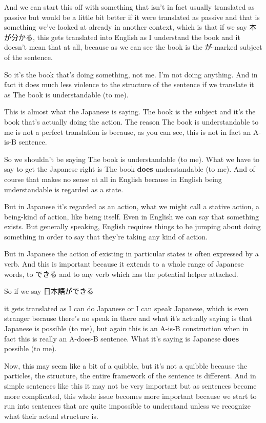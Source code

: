 And we can start this off with something that isn't in fact usually translated as passive but would be a little bit better if it were translated as passive and that is something we've looked at already in another context, which is that if we say 本が分かる, this gets translated into English as I understand the book and it doesn't mean that at all, because as we can see the book is the が-marked subject of the sentence.

{}

So it's the book that's doing something, not me. I'm not doing anything. And in fact it does much less violence to the structure of the sentence if we translate it as The book is understandable (to me).

This is almost what the Japanese is saying. The book is the subject and it's the book that's actually doing the action. The reason The book is understandable to me is not a perfect translation is because, as you can see, this is not in fact an A-is-B sentence.

So we shouldn't be saying The book is understandable (to me). What we have to say to get the Japanese right is The book {\bf does} understandable (to me). And of course that makes no sense at all in English because in English being understandable is regarded as a state.

But in Japanese it's regarded as an action, what we might call a stative action, a being-kind of action, like being itself. Even in English we can say that something exists. But generally speaking, English requires things to be jumping about doing something in order to say that they're taking any kind of action.

But in Japanese the action of existing in particular states is often expressed by a verb. And this is important because it extends to a whole range of Japanese words, to できる and to any verb which has the potential helper attached.

So if we say 日本語ができる

{}

it gets translated as I can do Japanese or I can speak Japanese, which is even stranger because there's no speak in there and what it's actually saying is that Japanese is possible (to me), but again this is an A-is-B construction when in fact this is really an A-does-B sentence. What it's saying is Japanese {\bf does} possible (to me).

Now, this may seem like a bit of a quibble, but it's not a quibble because the particles, the structure, the entire framework of the sentence is different. And in simple sentences like this it may not be very important but as sentences become more complicated, this whole issue becomes more important because we start to run into sentences that are quite impossible to understand unless we recognize what their actual structure is.

